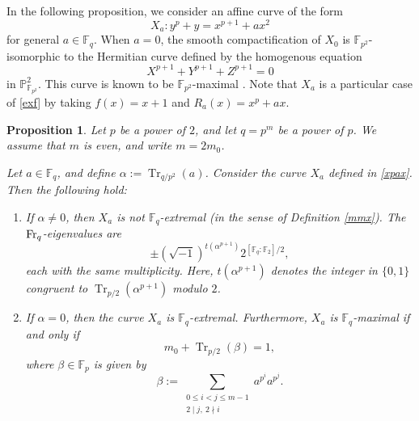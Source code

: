 \documentclass[12pt,a4paper]{amsart}
\newtheorem{proposition}[theorem]{Proposition}
\theoremstyle{definition}
\def\F{{\mathbb F}}
\theoremstyle{remark}
\DeclareMathOperator{\Tr}{Tr}
\begin{document}
\medskip

In the following proposition,
we consider an affine curve of the form 
\begin{equation}\label{xpax}
X_a\colon y^p+y=x^{p+1}+ax^2
\end{equation} 
for general $a \in \F_q$. When $a=0$, the smooth compactification of $X_0$ is $\F_{p^2}$-isomorphic to the Hermitian curve defined by the homogenous equation 
\[
X^{p+1}+Y^{p+1}+Z^{p+1}=0
\]
in $\mathbb{P}^2_{\F_{p^2}}$. 
This curve is known to be $\F_{p^2}$-maximal \cite[Example 6.3.6]{St}. Note that $X_a$ is 
a particular case of \eqref{exf}
by taking $f(x) = x+1$ and $R_a(x) = x^p + a x$. 


\begin{proposition}\label{Hermitian curve}
Let $p$ be a power of $2$, and let $q=p^m$ be a power of $p$.   We assume that $m$ is even, and write $m=2m_0$. 

Let $a\in \F_q$, and define $\alpha:=\Tr_{q/p^2}(a)$.  Consider the curve $X_a$ defined in \eqref{xpax}. Then the following hold: 
\begin{enumerate}
\item If $\alpha\neq0$, then $X_a$ is not $\F_q$-extremal (in the sense of Definition \ref{mmx}). The ${\rm Fr}_q$-eigenvalues are 
\[\pm(\sqrt{-1})^{t(\alpha^{p+1})}2^{[\F_q:\F_2]/2}, \]
each with the same multiplicity. Here, $t(\alpha^{p+1})$ denotes the integer in $\{0,1\}$ congruent to $\Tr_{p/2}(\alpha^{p+1})$ modulo $2$. 
\item If $\alpha=0$, then the curve $X_a$ is $\F_q$-extremal. Furthermore, $X_a$ is $\F_q$-maximal if and only if 
\[m_0+\Tr_{p/2}(\beta)=1,\]
 where $\beta\in\F_p$ is given by 
\[
\beta:=\sum_{\substack{0\leq i<j\leq m-1 \\ 2\mid j,\ 2\nmid i}}a^{p^i}a^{p^j}. 
\]
\end{enumerate}
\end{proposition}
\end{document}
